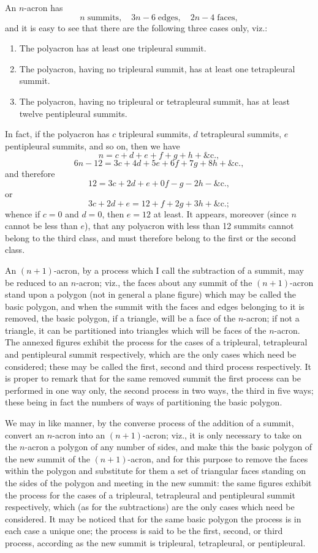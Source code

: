 \documentclass[11pt,a4paper]{article}
\begin{document}
An $n$-acron has
\[
n\;\text{summits},\quad 3n-6\;\text{edges},\quad 2n-4\;\text{faces},
\]
and it is easy to see that there are the following three cases only, viz.:
\begin{enumerate}[label=\arabic*.,leftmargin=2em]
\item The polyacron has at least one tripleural summit.
\item The polyacron, having no tripleural summit, has at least one tetrapleural summit.
\item The polyacron, having no tripleural or tetrapleural summit, has at least twelve pentipleural summits.
\end{enumerate}

In fact, if the polyacron has $c$ tripleural summits, $d$ tetrapleural summits, $e$ pentipleural summits, and so on, then we have
\[
n=c+d+e+f+g+h+\&\mathrm{c}.,
\]
\[
6n-12=3c+4d+5e+6f+7g+8h+\&\mathrm{c}.,
\]
and therefore
\[
12=3c+2d+e+0f-g-2h-\&\mathrm{c}.,
\]
or
\[
3c+2d+e=12+f+2g+3h+\&\mathrm{c}.;
\]
whence if $c=0$ and $d=0$, then $e=12$ at least. It appears, moreover (since $n$ cannot be less than $e$), that any polyacron with less than 12 summits cannot belong to the third class, and must therefore belong to the first or the second class.

An $(n+1)$-acron, by a process which I call the subtraction of a summit, may be reduced to an $n$-acron; viz., the faces about any summit of the $(n+1)$-acron stand upon a polygon (not in general a plane figure) which may be called the basic polygon, and when the summit with the faces and edges belonging to it is removed, the basic polygon, if a triangle, will be a face of the $n$-acron; if not a triangle, it can be partitioned into triangles which will be faces of the $n$-acron. The annexed figures exhibit the process for the cases of a tripleural, tetrapleural and pentipleural summit respectively, which are the only cases which need be considered; these may be called the first, second and third process respectively. It is proper to remark that for the same removed summit the first process can be performed in one way only, the second process in two ways, the third in five ways; these being in fact the numbers of ways of partitioning the basic polygon.

We may in like manner, by the converse process of the addition of a summit, convert an $n$-acron into an $(n+1)$-acron; viz., it is only necessary to take on the $n$-acron a polygon of any number of sides, and make this the basic polygon of the new summit of the $(n+1)$-acron, and for this purpose to remove the faces within the polygon and substitute for them a set of triangular faces standing on the sides of the polygon and meeting in the new summit: the same figures exhibit the process for the cases of a tripleural, tetrapleural and pentipleural summit respectively, which (as for the subtractions) are the only cases which need be considered. It may be noticed that for the same basic polygon the process is in each case a unique one; the process is said to be the first, second, or third process, according as the new summit is tripleural, tetrapleural, or pentipleural.
\end{document}
